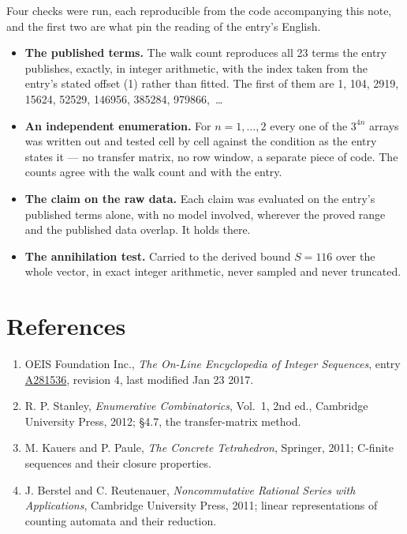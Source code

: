 \documentclass[11pt]{article}
\theoremstyle{definition}
\begin{document}
Four checks were run, each reproducible from the code accompanying this note, and the first two are what pin the reading of the entry's English.

\begin{itemize}

\item {\bfseries The published terms.} The walk count reproduces all 23 terms the entry publishes, exactly, in integer arithmetic, with the index taken from the entry's stated offset (1) rather than fitted. The first of them are 1, 104, 2919, 15624, 52529, 146956, 385284, 979866,~\dots

\item {\bfseries An independent enumeration.} For $n = 1,\dots,2$ every one of the $3^{4n}$ arrays was written out and tested cell by cell against the condition as the entry states it --- no transfer matrix, no row window, a separate piece of code. The counts agree with the walk count and with the entry.

\item {\bfseries The claim on the raw data.} Each claim was evaluated on the entry's published terms alone, with no model involved, wherever the proved range and the published data overlap. It holds there.

\item {\bfseries The annihilation test.} Carried to the derived bound $S = 116$ over the whole vector, in exact integer arithmetic, never sampled and never truncated.

\end{itemize}

\section{References}

\begin{enumerate}

\item OEIS Foundation Inc., \emph{The On-Line Encyclopedia of Integer Sequences}, entry \href{https://oeis.org/A281536}{A281536}, revision 4, last modified Jan 23 2017.

\item R. P. Stanley, \emph{Enumerative Combinatorics}, Vol.~1, 2nd ed., Cambridge University Press, 2012; \S4.7, the transfer-matrix method.

\item M. Kauers and P. Paule, \emph{The Concrete Tetrahedron}, Springer, 2011; C-finite sequences and their closure properties.

\item J. Berstel and C. Reutenauer, \emph{Noncommutative Rational Series with Applications}, Cambridge University Press, 2011; linear representations of counting automata and their reduction.

\end{enumerate}
\end{document}
